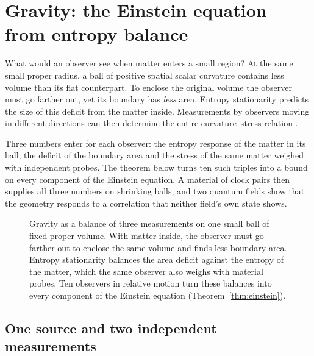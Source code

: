 \documentclass[11pt]{article}
\theoremstyle{definition}
\theoremstyle{remark}
\begin{document}
\section{Gravity: the Einstein equation from entropy balance}
\label{sec:einstein}

What would an observer see when matter enters a small region? At the same
small proper radius, a ball of positive spatial scalar curvature contains less
volume than its flat counterpart. To enclose the original volume the
observer must go farther out, yet its boundary has \emph{less} area.
Entropy stationarity predicts the size of this deficit from the matter
inside. Measurements by observers moving in different directions can then
determine the entire curvature--stress relation \cite{jacobson16,ophEinstein}.

Three numbers enter for each observer: the entropy response of the
matter in its ball, the deficit of the boundary area and the stress of
the same matter weighed with independent probes. The theorem below turns
ten such triples into a bound on every component of the Einstein
equation. A material of clock pairs then supplies all three numbers on
shrinking balls, and two quantum fields show that the geometry responds
to a correlation that neither field's own state shows.

\begin{figure}[!htb]
\centering

\caption{Gravity as a balance of three measurements on one small ball of
fixed proper volume. With matter inside, the observer must go farther out
to enclose the same volume and finds less boundary area. Entropy
stationarity balances the area deficit against the entropy of the
matter, which the same observer also weighs with material probes. Ten
observers in relative motion turn these balances into every component of
the Einstein equation (Theorem~\ref{thm:einstein}).}
\label{fig:einstein-ball}
\end{figure}

\subsection{One source and two independent measurements}
\label{sec:einstein-inputs}
\end{document}
